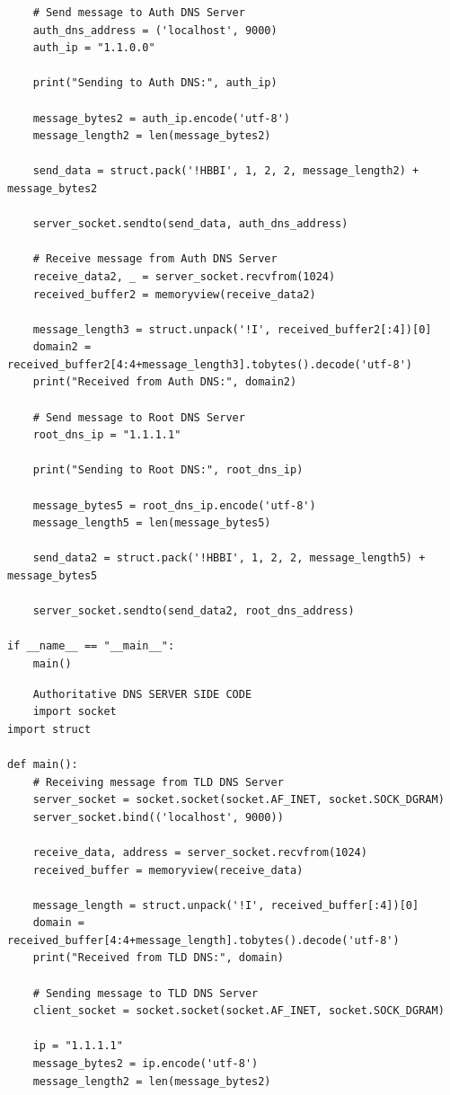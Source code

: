 \documentclass[11pt]{article}
\begin{document}
\begin{itemize}
\begin{itemize}
\begin{verbatim}
    # Send message to Auth DNS Server
    auth_dns_address = ('localhost', 9000)
    auth_ip = "1.1.0.0"

    print("Sending to Auth DNS:", auth_ip)

    message_bytes2 = auth_ip.encode('utf-8')
    message_length2 = len(message_bytes2)

    send_data = struct.pack('!HBBI', 1, 2, 2, message_length2) + message_bytes2

    server_socket.sendto(send_data, auth_dns_address)

    # Receive message from Auth DNS Server
    receive_data2, _ = server_socket.recvfrom(1024)
    received_buffer2 = memoryview(receive_data2)

    message_length3 = struct.unpack('!I', received_buffer2[:4])[0]
    domain2 = received_buffer2[4:4+message_length3].tobytes().decode('utf-8')
    print("Received from Auth DNS:", domain2)

    # Send message to Root DNS Server
    root_dns_ip = "1.1.1.1"

    print("Sending to Root DNS:", root_dns_ip)

    message_bytes5 = root_dns_ip.encode('utf-8')
    message_length5 = len(message_bytes5)

    send_data2 = struct.pack('!HBBI', 1, 2, 2, message_length5) + message_bytes5

    server_socket.sendto(send_data2, root_dns_address)

if __name__ == "__main__":
    main()

\end{verbatim}
 \begin{verbatim}
    Authoritative DNS SERVER SIDE CODE
    import socket
import struct

def main():
    # Receiving message from TLD DNS Server
    server_socket = socket.socket(socket.AF_INET, socket.SOCK_DGRAM)
    server_socket.bind(('localhost', 9000))

    receive_data, address = server_socket.recvfrom(1024)
    received_buffer = memoryview(receive_data)

    message_length = struct.unpack('!I', received_buffer[:4])[0]
    domain = received_buffer[4:4+message_length].tobytes().decode('utf-8')
    print("Received from TLD DNS:", domain)

    # Sending message to TLD DNS Server
    client_socket = socket.socket(socket.AF_INET, socket.SOCK_DGRAM)

    ip = "1.1.1.1"
    message_bytes2 = ip.encode('utf-8')
    message_length2 = len(message_bytes2)


\end{verbatim}
\end{itemize}
\end{itemize}
\end{document}
